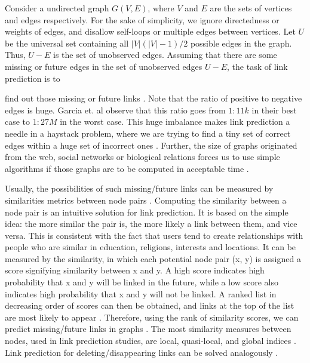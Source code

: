 Consider a undirected graph $G(V, E)$, where $V$ and $E$ are the sets of vertices and edges respectively. For the sake of simplicity, we ignore directedness or weights of edges, and disallow self-loops or multiple edges between vertices. Let $U$ be the universal set containing all $|V|(|V|-1)/2$ possible edges in the graph. Thus, $U - E$ is the set of unobserved edges. Assuming that there are some missing or future edges in the set of unobserved edges $U - E$, the task of link prediction is to find out those missing or future links \cite{zhou2021progresses}. Note that the ratio of positive to negative edges is huge. Garcia et. al \cite{garcia2014link} observe that this ratio goes from $1 : 11k$ in their best case to $1 : 27M$ in the worst case. This huge imbalance makes link prediction a needle in a haystack problem, where we are trying to find a tiny set of correct edges within a huge set of incorrect ones \cite{garcia2014link, wang2014link}. Further, the size of graphs originated from the web, social networks or biological relations forces us to use simple algorithms if those graphs are to be computed in acceptable time \cite{garcia2014link}.

Usually, the possibilities of such missing/future links can be measured by similarities metrics between node pairs \cite{wang2014link, arrar2023comprehensive}. Computing the similarity between a node pair is an intuitive solution for link prediction. It is based on the simple idea: the more similar the pair is, the more likely a link between them, and vice versa. This is consistent with the fact that users tend to create relationships with people who are similar in education, religions, interests and locations. It can be measured by the similarity, in which each potential node pair (x, y) is assigned a score signifying similarity between x and y. A high score indicates high probability that x and y will be linked in the future, while a low score also indicates high probability that x and y will not be linked. A ranked list in decreasing order of scores can then be obtained, and links at the top of the list are most likely to appear \cite{wang2014link}. Therefore, using the rank of similarity scores, we can predict missing/future links in graphs \cite{wang2014link}. The most similarity measures between nodes, used in link prediction studies, are local, quasi-local, and global indices \cite{arrar2023comprehensive}. Link prediction for deleting/disappearing links can be solved analogously \cite{almansoori2012link}.


